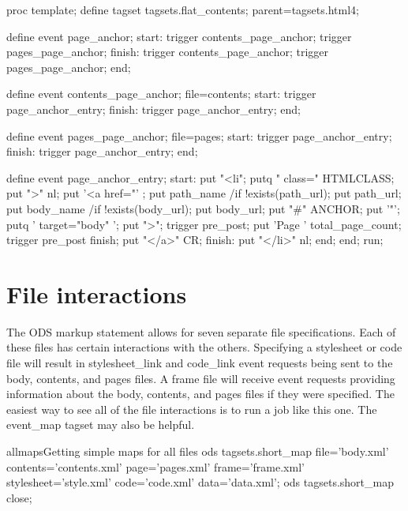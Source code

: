 \begin{sfvcode}
proc template;
    define tagset tagsets.flat_contents;
        parent=tagsets.html4;
 
        define event page_anchor;
            start:
                trigger contents_page_anchor;
                trigger pages_page_anchor;
            finish:
                trigger contents_page_anchor;
                trigger pages_page_anchor;
        end;

        define event contents_page_anchor;
            file=contents;
            start:
                trigger page_anchor_entry;
            finish:
                trigger page_anchor_entry;
        end;

        define event pages_page_anchor;
            file=pages;
            start:
                trigger page_anchor_entry;
            finish:
                trigger page_anchor_entry;
        end;

        define event page_anchor_entry;
            start:
                put "<li";
                putq " class=" HTMLCLASS;
                put ">" nl;
                put '<a href="' ;
                put path_name /if !exists(path_url);
                put path_url;
                put body_name /if !exists(body_url);
                put body_url;
                put "#" ANCHOR;
                put '"';
                putq ' target="body" ';
                put ">";
                trigger pre_post;
                put 'Page ' total_page_count;
                trigger pre_post finish;
                put "</a>" CR;
            finish:
                put "</li>" nl;
        end;
    end;
run;
\end{sfvcode}

\section{File interactions}
The ODS markup statement allows for seven separate file specifications.  Each of these 
files has certain interactions with the others.  Specifying a stylesheet or code file
will result in stylesheet\_link and code\_link event requests being sent to the body,
contents, and pages files.  A frame file will receive event requests providing information
about the body, contents, and pages files if they were specified.
The easiest way to see all of the file interactions is to run a job like this one.
The event\_map tagset may also be helpful.

\begin{fvcode}{allmaps}{Getting simple maps for all files}
ods tagsets.short_map file='body.xml' 
                  contents='contents.xml' 
                      page='pages.xml' 
                     frame='frame.xml' 
                stylesheet='style.xml' 
                      code='code.xml' 
                      data='data.xml';
ods tagsets.short_map close;
\end{fvcode}

